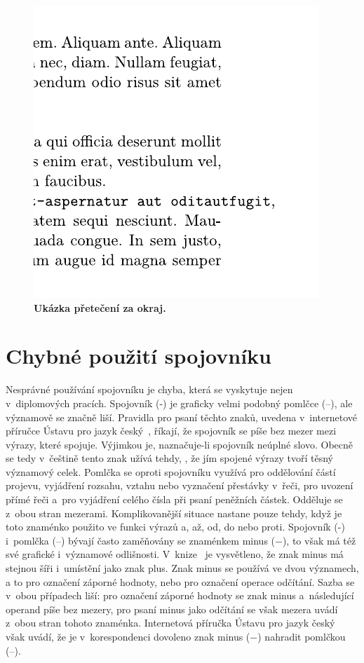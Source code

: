 \begin{figure}[H]
    \label{pic_overflow}
    \centering
    \includegraphics{obrazky-figures/overflow.pdf}
    \caption{\textbf{Ukázka přetečení za okraj.} }
\end{figure}


\section{Chybné použití spojovníku}
Nesprávné používání spojovníku je chyba, která se vyskytuje nejen v~diplomových
pracích. Spojovník (-) je graficky velmi podobný pomlčce (--), ale významově
se značně liší. Pravidla pro psaní těchto znaků, uvedena v~internetové příručce
Ústavu pro jazyk český~\cite{Ustav_pro_jazyk_cesky},
říkají, že spojovník se píše bez mezer mezi výrazy, které spojuje. Výjimkou
je, naznačuje-li spojovník neúplné slovo. Obecně se tedy v~češtině tento znak
užívá tehdy, , že jím spojené výrazy tvoří těsný významový
celek. Pomlčka se oproti spojovníku využívá pro oddělování částí projevu,
vyjádření rozsahu, vztahu nebo vyznačení přestávky v~řeči, pro uvození
přímé řeči a~pro vyjádření celého čísla při psaní peněžních částek.
Odděluje se z~obou stran mezerami. Komplikovanější situace nastane pouze
tehdy, když je toto znaménko použito ve funkci výrazů a, až, od, do nebo proti.
Spojovník (-) i~pomlčka (--) bývají často zaměňovány se znaménkem minus ($-$),
to však má též své grafické i~významové odlišnosti.
V~knize~\cite{Pruvodce_tvorbou_dokumentu} je vysvětleno, že znak minus má stejnou
šíři i~umístění jako znak plus. Znak minus se používá ve dvou významech, a to
pro označení záporné hodnoty, nebo pro označení operace odčítání. Sazba se v~obou
případech liší: pro označení záporné hodnoty se znak minus a~následující
operand píše bez mezery, pro psaní minus jako odčítání se však mezera uvádí
z~obou stran tohoto znaménka. Internetová příručka Ústavu pro jazyk
český~\cite{Ustav_pro_jazyk_cesky} však uvádí, že je v~korespondenci dovoleno
znak minus ($-$) nahradit pomlčkou (--).

